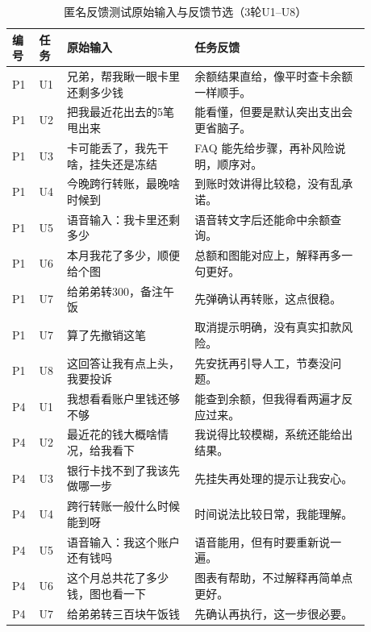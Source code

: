 \documentclass[bachelor, print]{xduthesis}
\begin{document}
\begin{appendix}
\begin{table}[H]
    \centering
    \caption{匿名反馈测试原始输入与反馈节选（3轮U1--U8）}
    \label{tab:usability-query-feedback-appendix}
    \scriptsize
    \setlength{\tabcolsep}{2pt}
    \begin{tabular}{|p{0.06\linewidth}|p{0.06\linewidth}|p{0.32\linewidth}|p{0.44\linewidth}|}
        \hline
        编号 & 任务 & 原始输入 & 任务反馈 \\
        \hline
        P1 & U1 & 兄弟，帮我瞅一眼卡里还剩多少钱 & 余额结果直给，像平时查卡余额一样顺手。 \\
        \hline
        P1 & U2 & 把我最近花出去的5笔甩出来 & 能看懂，但要是默认突出支出会更省脑子。 \\
        \hline
        P1 & U3 & 卡可能丢了，我先干啥，挂失还是冻结 & FAQ 能先给步骤，再补风险说明，顺序对。 \\
        \hline
        P1 & U4 & 今晚跨行转账，最晚啥时候到 & 到账时效讲得比较稳，没有乱承诺。 \\
        \hline
        P1 & U5 & 语音输入：我卡里还剩多少 & 语音转文字后还能命中余额查询。 \\
        \hline
        P1 & U6 & 本月我花了多少，顺便给个图 & 总额和图能对应上，解释再多一句更好。 \\
        \hline
        P1 & U7 & 给弟弟转300，备注午饭 & 先弹确认再转账，这点很稳。 \\
        \hline
        P1 & U7 & 算了先撤销这笔 & 取消提示明确，没有真实扣款风险。 \\
        \hline
        P1 & U8 & 这回答让我有点上头，我要投诉 & 先安抚再引导人工，节奏没问题。 \\
        \hline
        P4 & U1 & 我想看看账户里钱还够不够 & 能查到余额，但我得看两遍才反应过来。 \\
        \hline
        P4 & U2 & 最近花的钱大概啥情况，给我看下 & 我说得比较模糊，系统还能给出结果。 \\
        \hline
        P4 & U3 & 银行卡找不到了我该先做哪一步 & 先挂失再处理的提示让我安心。 \\
        \hline
        P4 & U4 & 跨行转账一般什么时候能到呀 & 时间说法比较日常，我能理解。 \\
        \hline
        P4 & U5 & 语音输入：我这个账户还有钱吗 & 语音能用，但有时要重新说一遍。 \\
        \hline
        P4 & U6 & 这个月总共花了多少钱，图也看一下 & 图表有帮助，不过解释再简单点更好。 \\
        \hline
        P4 & U7 & 给弟弟转三百块午饭钱 & 先确认再执行，这一步很必要。 \\

\end{tabular}
\end{table}
\end{appendix}
\end{document}
